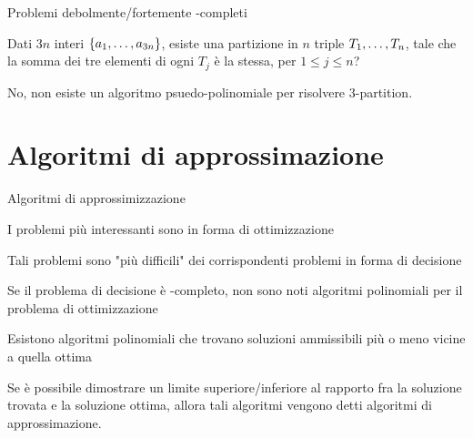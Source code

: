 \begin{frame}{Problemi debolmente/fortemente \NP-completi}

\vspace{-9pt}
\begin{myboxtitle}
Dati $3n$ interi $\{a_1, \ldots, a_{3n}\}$, esiste una partizione in $n$
triple $T_1, \ldots, T_n$, tale che la somma dei tre elementi di ogni $T_j$ è
la stessa, per $1 \le j \le n$?
\end{myboxtitle}

\begin{myboxtitle}
\pause
No, non esiste un algoritmo psuedo-polinomiale per risolvere 3-partition.
\end{myboxtitle}

\end{frame}

\section{Algoritmi di approssimazione}

\begin{frame}{Algoritmi di approssimizzazione}

\vspace{-9pt}
\begin{myboxtitle}[Premessa]
\BIL
\item I problemi più interessanti sono in forma di ottimizzazione
\item Tali problemi sono "più difficili" dei corrispondenti problemi
in forma di decisione
\item Se il problema di decisione è \NP-completo, non sono noti 
algoritmi polinomiali per il problema di ottimizzazione
\item Esistono algoritmi polinomiali che trovano soluzioni ammissibili
più o meno vicine a quella ottima
\EIL
\end{myboxtitle}

\begin{myboxtitle}
Se è possibile dimostrare un limite superiore/inferiore al rapporto fra la soluzione trovata e la soluzione ottima, allora tali algoritmi
vengono detti \alert{algoritmi di approssimazione}.
\end{myboxtitle}

\end{frame}

